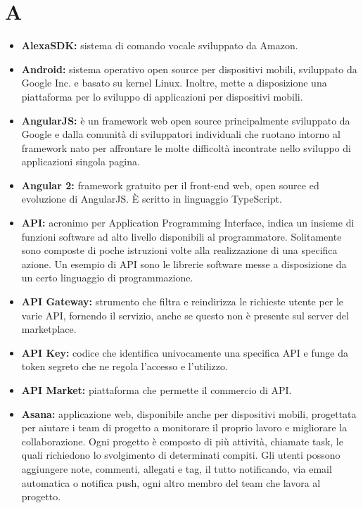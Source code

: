 \newpage
\section{A}

\begin{itemize}
	\item \textbf{AlexaSDK:} sistema di comando vocale sviluppato da Amazon.
	\item \textbf{Android:} sistema operativo open source per dispositivi mobili, sviluppato da Google Inc. e basato su kernel Linux. Inoltre, mette a disposizione una piattaforma per lo sviluppo di applicazioni per dispositivi mobili.
	\item \textbf{AngularJS:} è un framework web open source principalmente sviluppato da Google e dalla comunità di sviluppatori individuali che ruotano intorno al framework nato per affrontare le molte difficoltà incontrate nello sviluppo di applicazioni singola pagina.
	\item \textbf{Angular 2:} framework gratuito per il front-end web, open source ed evoluzione di AngularJS. \MakeUppercase{è} scritto in linguaggio TypeScript.
	\item \textbf{API:} acronimo per Application Programming Interface, indica un insieme di funzioni software ad alto livello disponibili al programmatore. Solitamente sono composte di poche istruzioni volte alla realizzazione di una specifica azione. Un esempio di API sono le librerie software messe a disposizione da un certo linguaggio di programmazione.
	\item \textbf{API Gateway:} strumento che filtra e reindirizza le richieste utente per le varie API, fornendo il servizio, anche se questo non è presente sul server del marketplace.
	\item \textbf{API Key:} codice che identifica univocamente una specifica API e funge da token segreto che ne regola l'accesso e l'utilizzo.
	\item \textbf{API Market:} piattaforma che permette il commercio di API.
	\item \textbf{Asana:} applicazione web, disponibile anche per dispositivi mobili, progettata per aiutare i team di progetto a monitorare il proprio lavoro e migliorare la collaborazione. Ogni progetto è composto di più attività, chiamate task, le quali richiedono lo svolgimento di determinati compiti. Gli utenti possono aggiungere note, commenti, allegati e tag, il tutto notificando, via email automatica o notifica push, ogni altro membro del team che lavora al progetto.

\end{itemize}
